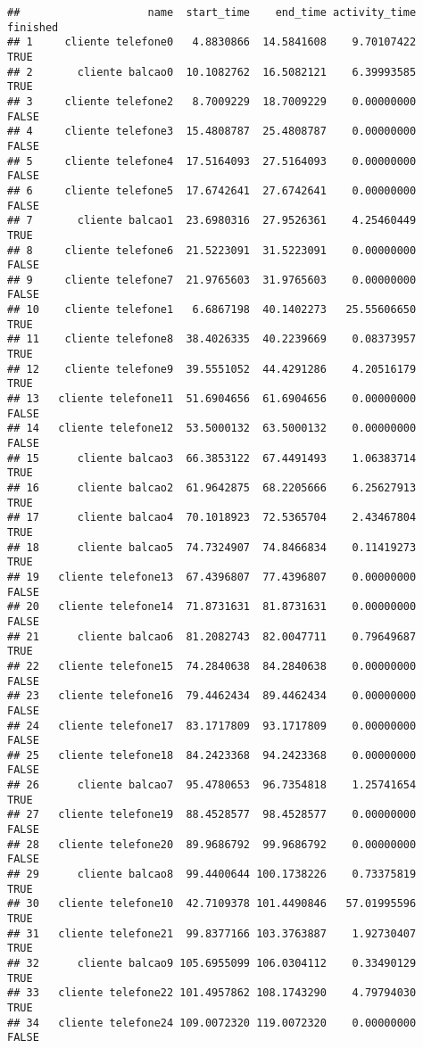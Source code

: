 \documentclass[
]{article}
\begin{document}
\begin{verbatim}
##                    name  start_time    end_time activity_time finished
## 1     cliente telefone0   4.8830866  14.5841608    9.70107422     TRUE
## 2       cliente balcao0  10.1082762  16.5082121    6.39993585     TRUE
## 3     cliente telefone2   8.7009229  18.7009229    0.00000000    FALSE
## 4     cliente telefone3  15.4808787  25.4808787    0.00000000    FALSE
## 5     cliente telefone4  17.5164093  27.5164093    0.00000000    FALSE
## 6     cliente telefone5  17.6742641  27.6742641    0.00000000    FALSE
## 7       cliente balcao1  23.6980316  27.9526361    4.25460449     TRUE
## 8     cliente telefone6  21.5223091  31.5223091    0.00000000    FALSE
## 9     cliente telefone7  21.9765603  31.9765603    0.00000000    FALSE
## 10    cliente telefone1   6.6867198  40.1402273   25.55606650     TRUE
## 11    cliente telefone8  38.4026335  40.2239669    0.08373957     TRUE
## 12    cliente telefone9  39.5551052  44.4291286    4.20516179     TRUE
## 13   cliente telefone11  51.6904656  61.6904656    0.00000000    FALSE
## 14   cliente telefone12  53.5000132  63.5000132    0.00000000    FALSE
## 15      cliente balcao3  66.3853122  67.4491493    1.06383714     TRUE
## 16      cliente balcao2  61.9642875  68.2205666    6.25627913     TRUE
## 17      cliente balcao4  70.1018923  72.5365704    2.43467804     TRUE
## 18      cliente balcao5  74.7324907  74.8466834    0.11419273     TRUE
## 19   cliente telefone13  67.4396807  77.4396807    0.00000000    FALSE
## 20   cliente telefone14  71.8731631  81.8731631    0.00000000    FALSE
## 21      cliente balcao6  81.2082743  82.0047711    0.79649687     TRUE
## 22   cliente telefone15  74.2840638  84.2840638    0.00000000    FALSE
## 23   cliente telefone16  79.4462434  89.4462434    0.00000000    FALSE
## 24   cliente telefone17  83.1717809  93.1717809    0.00000000    FALSE
## 25   cliente telefone18  84.2423368  94.2423368    0.00000000    FALSE
## 26      cliente balcao7  95.4780653  96.7354818    1.25741654     TRUE
## 27   cliente telefone19  88.4528577  98.4528577    0.00000000    FALSE
## 28   cliente telefone20  89.9686792  99.9686792    0.00000000    FALSE
## 29      cliente balcao8  99.4400644 100.1738226    0.73375819     TRUE
## 30   cliente telefone10  42.7109378 101.4490846   57.01995596     TRUE
## 31   cliente telefone21  99.8377166 103.3763887    1.92730407     TRUE
## 32      cliente balcao9 105.6955099 106.0304112    0.33490129     TRUE
## 33   cliente telefone22 101.4957862 108.1743290    4.79794030     TRUE
## 34   cliente telefone24 109.0072320 119.0072320    0.00000000    FALSE

\end{verbatim}
\end{document}
